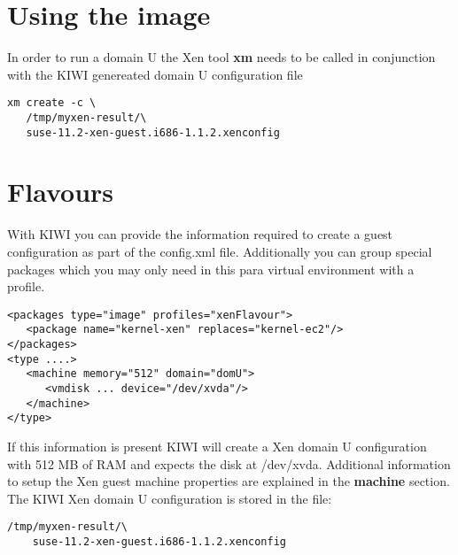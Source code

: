 \section{Using the image}

In order to run a domain U the Xen tool \textbf{xm} needs to be called
in conjunction with the KIWI genereated domain U configuration file

\begin{Command}{13cm}
\begin{verbatim}
xm create -c \
   /tmp/myxen-result/\
   suse-11.2-xen-guest.i686-1.1.2.xenconfig
\end{verbatim}
\end{Command}

\section{Flavours}

With KIWI you can provide the information
required to create a guest configuration as part of the config.xml
file. Additionally you can group special packages which you may only
need in this para virtual environment with a profile.

\begin{Command}{13cm}
\begin{verbatim}
<packages type="image" profiles="xenFlavour">
   <package name="kernel-xen" replaces="kernel-ec2"/>
</packages>
<type ....>
   <machine memory="512" domain="domU">
      <vmdisk ... device="/dev/xvda"/>
   </machine>
</type>
\end{verbatim}
\end{Command}

If this information is present KIWI will create a Xen domain U
configuration with 512 MB of RAM and expects the disk at /dev/xvda.
Additional information to setup the Xen guest machine properties are
explained in the \textbf{machine} section. The KIWI Xen domain U
configuration is stored in the file:

\begin{Command}{13cm}
\begin{verbatim}
/tmp/myxen-result/\
    suse-11.2-xen-guest.i686-1.1.2.xenconfig
\end{verbatim}
\end{Command}
